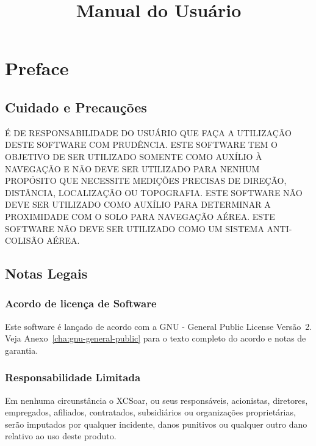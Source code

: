 \documentclass[a4paper,11pt]{refrep}
\title{Manual do Usuário}
\begin{document}
\maketitle

 
\begingroup
{}
\normalsize
{}\selectfont
\setlength{\parskip}{0.05\baselineskip}
\tableofcontents
\endgroup


\chapter*{Preface}

\section*{Cuidado e Precauções}

\warning É DE RESPONSABILIDADE DO USUÁRIO QUE FAÇA A
UTILI\-ZAÇÃO DESTE SOFTWARE COM PRUDÊNCIA. ESTE
SOFTWARE TEM O OBJETIVO DE SER UTILIZADO SOMENTE
COMO AUXÍLIO À NAVEGAÇÃO E NÃO DEVE SER UTILIZADO
PARA NENHUM PROPÓSITO QUE NECESSITE MEDIÇÕES
PRECISAS DE DIREÇÃO, DISTÂNCIA, LOCALIZAÇÃO OU
TOPOGRAFIA. ESTE SOFTWARE NÃO DEVE SER UTILIZADO
COMO AUXÍLIO PARA DETERMINAR A PROXIMIDADE COM O
SOLO PARA NAVE\-GAÇÃO AÉREA. ESTE SOFTWARE NÃO DEVE
SER UTILIZADO COMO UM SISTEMA ANTI-COLISÃO AÉREA.



\section*{Notas Legais}

\subsection*{Acordo de licença de Software}

Este software é lançado de acordo com a GNU - General Public License
Versão~2. Veja Anexo~\ref{cha:gnu-general-public} para o texto completo do acordo e notas de
garantia.

\subsection*{Responsabilidade Limitada}

Em nenhuma circunstância o XCSoar, ou seus responsáveis, acionistas,
diretores, empregados, afiliados, contratados, subsidiários ou
organizações proprietárias, serão imputados por qualquer incidente,
danos punitivos ou qualquer outro dano relativo ao uso deste produto.
\end{document}
